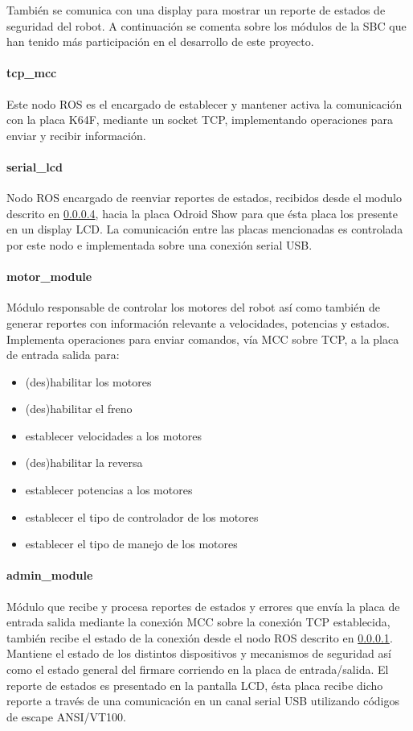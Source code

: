 \documentclass[withindex,glossary]{cam-thesis}
\begin{document}
También se comunica con una display para mostrar un reporte de estados de seguridad del robot.
A continuación se comenta sobre los módulos de la \gls{SBC} que han tenido más participación en el desarrollo de este proyecto.

\paragraph{tcp\_mcc} \label{sec:Sol Prop :: tcp_mcc}
Este nodo ROS es el encargado de establecer y mantener activa la comunicación con la placa K64F, mediante un socket TCP, implementando operaciones para enviar y recibir información.

\paragraph{serial\_lcd}
Nodo ROS encargado de reenviar reportes de estados, recibidos desde el modulo descrito en \ref{sec:Sol Prop :: admin_module}, hacia la placa Odroid Show para que ésta placa los presente en un display LCD. La comunicación entre las placas mencionadas es controlada por este nodo e implementada sobre una conexión serial USB.

\paragraph{motor\_module}
Módulo responsable de controlar los motores del robot así como también  de generar reportes con información relevante a velocidades, potencias y estados. Implementa operaciones para enviar comandos, vía MCC sobre TCP, a la placa de entrada salida para:
\begin{itemize}
	\item (des)habilitar los motores	
	\item (des)habilitar el freno	
	\item establecer velocidades a los motores
	\item (des)habilitar la reversa
	\item establecer potencias a los motores
	\item establecer el tipo de controlador de los motores
	\item establecer el tipo de manejo de los motores
\end{itemize}

\paragraph{admin\_module} \label{sec:Sol Prop :: admin_module}
Módulo que recibe y procesa reportes de estados y errores que envía la placa de entrada salida mediante la conexión MCC sobre la conexión TCP establecida, también recibe el estado de la conexión desde el nodo ROS descrito en \ref{sec:Sol Prop :: tcp_mcc}. Mantiene el estado de los distintos dispositivos y mecanismos de seguridad así como el estado general del firmare corriendo en la placa de entrada/salida. El reporte de estados es presentado en la pantalla LCD, ésta placa recibe dicho reporte a través de una comunicación en un canal serial USB utilizando códigos de escape ANSI/VT100.
\end{document}
